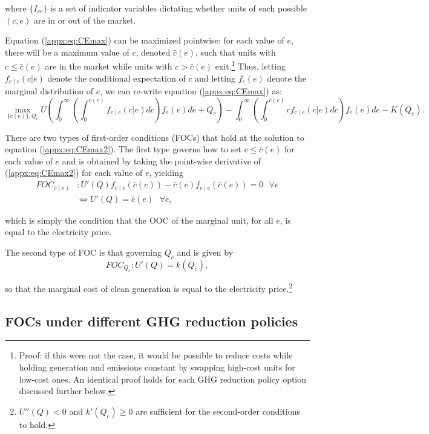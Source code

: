 \documentclass[12pt]{article}
\begin{document}
\noindent where $\{I_{ce}\}$ is a set of indicator variables dictating whether units of each possible $(c,e)$ are in or out of the market.

Equation (\ref{appx:eq:CEmax}) can be maximized pointwise: for each value of $e$, there will be a maximum value of $c$, denoted $\bar{c}(e)$, such that units with $c\leq\bar{c}(e)$ are in the market while units with $c>\bar{c}(e)$ exit.\footnote{Proof: if this were not the case, it would be possible to reduce costs while holding generation and emissions constant by swapping high-cost units for low-cost ones. An identical proof holds for each GHG reduction policy option discussed further below.} Thus, letting $f_{c\mid e}(c|e)$ denote the conditional expectation of $c$ and letting $f_e(e)$ denote the marginal distribution of $e$, we can re-write equation (\ref{appx:eq:CEmax}) as:
\begin{equation}
    \max_{\{\bar{c}(e)\},Q_c} U\left(\int_0^\infty\left(\int_0^{\bar{c}(e)}f_{c\mid e}(c|e)dc\right)f_e(e)de + Q_c\right) - \int_0^\infty\left(\int_0^{\bar{c}(e)}cf_{c\mid e}(c|e)dc\right)f_e(e)de - K(Q_c). \label{appx:eq:CEmax2}
\end{equation}

There are two types of first-order conditions (FOCs) that hold at the solution to equation (\ref{appx:eq:CEmax2}). The first type governs how to set $c\leq\bar{c}(e)$ for each value of $e$ and is obtained by taking the point-wise derivative of (\ref{appx:eq:CEmax2}) for each value of $e$, yielding
\begin{align}
    FOC_{\bar{c}(e)}&: U'(Q)f_{c\mid e}(\bar{c}(e)) - \bar{c}(e)f_{c\mid e}(\bar{c}(e))=0\text{  } \forall e \nonumber \\
    & \Leftrightarrow U'(Q) = \bar{c}(e)\text{  } \forall e, \label{appx:eq:FOC}
\end{align}

\noindent which is simply the condition that the OOC of the marginal unit, for all $e$, is equal to the electricity price.

The second type of FOC is that governing $Q_c$ and is given by
\begin{equation}
    FOC_{Q_c}: U'(Q) = k(Q_c),
\end{equation}

\noindent so that the marginal cost of clean generation is equal to the electricity price.\footnote{$U''(Q)<0$ and $k'(Q_c)\geq0$ are sufficient for the second-order conditions to hold.}


\subsection*{FOCs under different GHG reduction policies}
\end{document}
